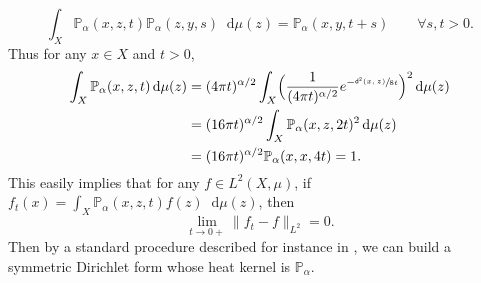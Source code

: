 \documentclass[JEP,XML,SOM,Unicode,published]{cedram}
\theoremstyle{plain}
\theoremstyle{definition}
\newcommand{\bP}{\mathbb{P}}
\newcommand{\di}{\mathop{}\!\mathrm{d}}
\newcommand{\dist}{\mathsf{d}}
\begin{document}
\[
\int_X \bP_\alpha(x,z,t) \bP_\alpha(z,y,s)\di\mu(z)= \bP_\alpha(x,y,t+s) \qquad \forall s,t >0.
\]
Thus for any $x \in X$ and $t>0$,
\begin{align*}
\int_X \bP_\alpha(x,z,t) \di \mu(z) & = (4 \pi t)^{\alpha/2} \int_X \Bigl(\frac{1}{(4 \pi t)^{\alpha/2}} e^{-\sfrac{\dist^2(x,z)}{8t}} \Bigr)^2 \di \mu(z)\\
& = (16 \pi t)^{\alpha/2} \int_X \bP_\alpha(x,z,2t)^2 \di \mu(z)\\ & =(16 \pi t)^{\alpha/2} \bP_\alpha(x,x,4t) = 1.
\end{align*}
This easily implies that for any $f\in L^2(X,\mu)$, if
$f_t(x)=\int_X \bP_\alpha(x,z,t)f(z) \di\mu(z)$, then
\[
\lim_{t\to 0+} \|f_t-f\|_{L^2}=0.
\]
Then by a standard procedure described for instance in \cite[\S 2]{Grigor'yan}, we can build a symmetric Dirichlet form whose heat kernel is $\bP_\alpha$.
\endproof
\end{document}
